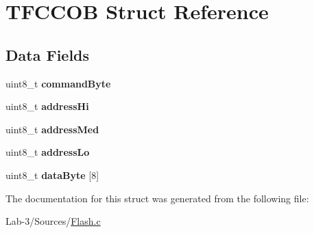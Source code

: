 \hypertarget{struct_t_f_c_c_o_b}{}\section{T\+F\+C\+C\+OB Struct Reference}
\label{struct_t_f_c_c_o_b}
\subsection*{Data Fields}
\begin{DoxyCompactItemize}
\item 
\mbox{\label{struct_t_f_c_c_o_b_a804a673cb0342150d8d719455ddd2d5b}} 
uint8\+\_\+t {\bfseries command\+Byte}
\item 
\mbox{\label{struct_t_f_c_c_o_b_a9b020b61a51882f5d208f95ff0bd54e3}} 
uint8\+\_\+t {\bfseries address\+Hi}
\item 
\mbox{\label{struct_t_f_c_c_o_b_a075aaffe3d8d6fc284df0d689dc870c5}} 
uint8\+\_\+t {\bfseries address\+Med}
\item 
\mbox{\label{struct_t_f_c_c_o_b_ad67ea43d204f1eaf32fd11892c674cf3}} 
uint8\+\_\+t {\bfseries address\+Lo}
\item 
\mbox{\label{struct_t_f_c_c_o_b_a48f2a63ab534a4d86db1329f568e12f5}} 
uint8\+\_\+t {\bfseries data\+Byte} \mbox{[}8\mbox{]}
\end{DoxyCompactItemize}


The documentation for this struct was generated from the following file\+:\begin{DoxyCompactItemize}
\item 
Lab-\/3/\+Sources/\hyperlink{_flash_8c}{Flash.\+c}\end{DoxyCompactItemize}
